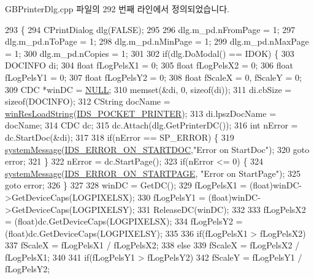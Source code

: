 G\+B\+Printer\+Dlg.\+cpp 파일의 292 번째 라인에서 정의되었습니다.


\begin{DoxyCode}
293 \{
294   CPrintDialog dlg(FALSE);
295 
296   dlg.m\_pd.nFromPage = 1;
297   dlg.m\_pd.nToPage = 1;
298   dlg.m\_pd.nMinPage = 1;
299   dlg.m\_pd.nMaxPage = 1;
300   dlg.m\_pd.nCopies = 1;
301 
302   \textcolor{keywordflow}{if}(dlg.DoModal() == IDOK) \{
303     DOCINFO di;
304     \textcolor{keywordtype}{float} fLogPelsX1 = 0;
305     \textcolor{keywordtype}{float} fLogPelsX2 = 0;
306     \textcolor{keywordtype}{float} fLogPelsY1 = 0;
307     \textcolor{keywordtype}{float} fLogPelsY2 = 0;
308     \textcolor{keywordtype}{float} fScaleX = 0, fScaleY = 0;    
309     CDC *winDC = \mbox{\hyperlink{getopt1_8c_a070d2ce7b6bb7e5c05602aa8c308d0c4}{NULL}};
310     memset(&di, 0, \textcolor{keyword}{sizeof}(di));
311     di.cbSize = \textcolor{keyword}{sizeof}(DOCINFO);
312     CString docName = \mbox{\hyperlink{_win_res_util_8cpp_a416e85e80ab9b01376e87251c83d1a5a}{winResLoadString}}(\mbox{\hyperlink{resource_8h_a7daa7052f6d7101dd3c5a7ac9ba13742}{IDS\_POCKET\_PRINTER}});
313     di.lpszDocName = docName;
314     CDC dc;
315     dc.Attach(dlg.GetPrinterDC());
316     \textcolor{keywordtype}{int} nError = dc.StartDoc(&di);
317 
318     \textcolor{keywordflow}{if}(nError == SP\_ERROR) \{
319       \mbox{\hyperlink{system_8cpp_a747a9cb8e015a3d45cca636b5bd0fc69}{systemMessage}}(\mbox{\hyperlink{resource_8h_a141003970aa7b4f4b0db122ff25691ba}{IDS\_ERROR\_ON\_STARTDOC}},\textcolor{stringliteral}{"Error on StartDoc"});
320       \textcolor{keywordflow}{goto} error;
321     \}
322     nError = dc.StartPage();
323     \textcolor{keywordflow}{if}(nError <= 0) \{
324       \mbox{\hyperlink{system_8cpp_a747a9cb8e015a3d45cca636b5bd0fc69}{systemMessage}}(\mbox{\hyperlink{resource_8h_a3d88d34464fbb91c0ac402e47a613c8b}{IDS\_ERROR\_ON\_STARTPAGE}}, \textcolor{stringliteral}{"Error on StartPage"});
325       \textcolor{keywordflow}{goto} error;
326     \}
327 
328     winDC = GetDC();
329     fLogPelsX1 = (float)winDC->GetDeviceCaps(LOGPIXELSX);
330     fLogPelsY1 = (float)winDC->GetDeviceCaps(LOGPIXELSY);
331     ReleaseDC(winDC);
332 
333     fLogPelsX2 = (float)dc.GetDeviceCaps(LOGPIXELSX);
334     fLogPelsY2 = (float)dc.GetDeviceCaps(LOGPIXELSY);
335     
336     \textcolor{keywordflow}{if}(fLogPelsX1 > fLogPelsX2)
337       fScaleX = fLogPelsX1 / fLogPelsX2;
338     \textcolor{keywordflow}{else}
339       fScaleX = fLogPelsX2 / fLogPelsX1;
340 
341     \textcolor{keywordflow}{if}(fLogPelsY1 > fLogPelsY2)
342       fScaleY = fLogPelsY1 / fLogPelsY2;

\end{DoxyCode}
